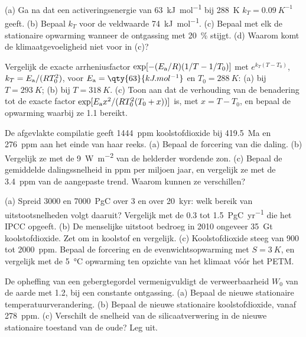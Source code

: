 \begin{exercise}[$\star\star$]\label{exo:b2:deep-time-climate:5}
(a) Ga na dat een activeringsenergie van \qty{63}{kJ.mol^{-1}} bij \qty{288}{K} $k_T =
\qty{0.09}{K^{-1}}$ geeft. (b) Bepaal $k_T$ voor de veldwaarde \qty{74}{kJ.mol^{-1}}. (c) Bepaal met elk
de stationaire opwarming wanneer de ontgassing met \qty{20}{\percent} stijgt. (d) Waarom komt de
klimaatgevoeligheid niet voor in (c)?
\end{exercise}

\begin{exercise}[$\star\star$]\label{exo:b2:deep-time-climate:6}
Vergelijk de exacte arrheniusfactor $\exp[-(E_{\text a}/R)(1/T - 1/T_0)]$ met $e^{k_T(T -
T_0)}$, $k_T = E_{\text a}/(RT_0^2)$, voor $E_{\text a} = \qty{63}{kJ.mol^{-1}}$ en $T_0 =
\qty{288}{K}$: (a) bij $T = \qty{293}{K}$; (b) bij $T = \qty{318}{K}$. (c) Toon aan dat de verhouding van de
benadering tot de exacte factor $\exp[E_{\text a}x^2/(RT_0^2(T_0 + x))]$ is, met $x = T - T_0$,
en bepaal de opwarming waarbij ze 1.1 bereikt.
\end{exercise}

\begin{exercise}[$\star\star$]\label{exo:b2:deep-time-climate:7}
De afgevlakte compilatie geeft \qty{1444}{ppm} koolstofdioxide bij \qty{419.5}{Ma} en
\qty{276}{ppm} aan het einde van haar reeks. (a) Bepaal de forcering van die daling. (b) Vergelijk ze met
de \qty{9}{W.m^{-2}} van de helderder wordende zon. (c) Bepaal de gemiddelde dalingssnelheid in ppm per miljoen
jaar, en vergelijk ze met de \qty{3.4}{ppm} van de aangepaste trend. Waarom kunnen ze verschillen?
\end{exercise}

\begin{exercise}[$\star\star$]\label{exo:b2:deep-time-climate:8}
(a) Spreid \num{3000} en \qty{7000}{PgC} over 3 en over \qty{20}{kyr}: welk bereik van
uitstootsnelheden volgt daaruit? Vergelijk met de 0.3 tot \qty{1.5}{PgC.yr^{-1}} die het IPCC opgeeft. (b) De menselijke uitstoot
bedroeg in 2010 ongeveer \qty{35}{Gt} koolstofdioxide. Zet om in koolstof en vergelijk. (c)
Koolstofdioxide steeg van 900 tot \qty{2000}{ppm}. Bepaal de forcering en de evenwichtsopwarming met $S =
\qty{3}{K}$, en vergelijk met de \qty{5}{\celsius} opwarming ten opzichte van het klimaat vóór het PETM.
\end{exercise}

\begin{exercise}[$\star\star$]\label{exo:b2:deep-time-climate:9}
De opheffing van een gebergtegordel vermenigvuldigt de verweerbaarheid $W_0$ van de aarde met 1.2, bij een constante
ontgassing. (a) Bepaal de nieuwe stationaire temperatuurverandering. (b) Bepaal de nieuwe stationaire koolstofdioxide, vanaf
\qty{278}{ppm}. (c) Verschilt de snelheid van de silicaatverwering in de nieuwe stationaire toestand van de
oude? Leg uit.
\end{exercise}

